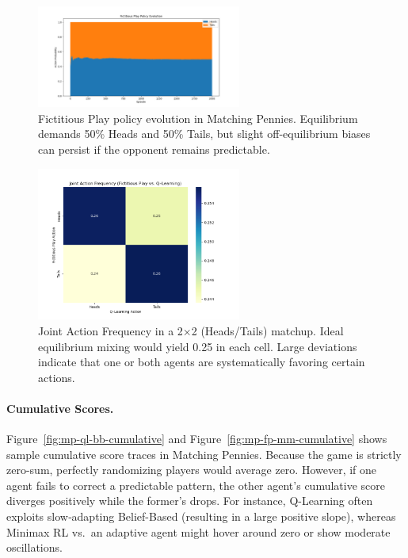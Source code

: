 \documentclass[11pt]{article}
\begin{document}
\begin{figure}[htbp]
    \centering
    \includegraphics[width=0.6\textwidth]{mp-plots/fp_vs_mm_fictitious_play_policy_evolution.png}
    \caption{Fictitious Play policy evolution in Matching Pennies. 
    Equilibrium demands 50\% Heads and 50\% Tails, but slight 
    off-equilibrium biases can persist if the opponent remains 
    predictable.}
    \label{fig:mp-fp-policy}
\end{figure}

\begin{figure}[htbp]
    \centering
    \includegraphics[width=0.6\textwidth]{mp-plots/fp_vs_ql_joint_actions.png}
    \caption{Joint Action Frequency in a 2$\times$2 (Heads/Tails) 
    matchup. Ideal equilibrium mixing would yield 0.25 in each cell. 
    Large deviations indicate that one or both agents are systematically 
    favoring certain actions.}
    \label{fig:mp-joint-heatmap}
\end{figure}

\paragraph{Cumulative Scores.}
Figure~\ref{fig:mp-ql-bb-cumulative} and Figure~\ref{fig:mp-fp-mm-cumulative} shows sample cumulative score traces in 
Matching Pennies. Because the game is strictly zero-sum, perfectly 
randomizing players would average zero. However, if one agent fails to 
correct a predictable pattern, the other agent’s cumulative score 
diverges positively while the former’s drops. For instance, Q-Learning 
often exploits slow‐adapting Belief-Based (resulting in a large positive 
slope), whereas Minimax RL vs.\ an adaptive agent might hover around 
zero or show moderate oscillations.
\end{document}
